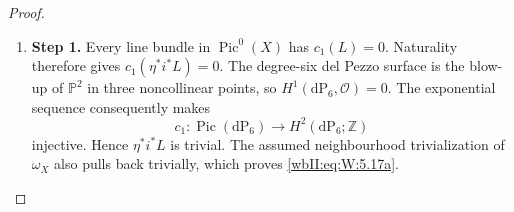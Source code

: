 \begin{proof}
\begin{enumerate}[label={$\langle1\rangle$\arabic*.},leftmargin=*]
\item 
\noindent\textbf{Step 1.} Every line bundle in $\operatorname{Pic}^0(X)$ has $c_1(L)=0$.  Naturality
therefore gives $c_1(\eta^*i^*L)=0$.  The degree-six del Pezzo surface is the
blow-up of $\mathbb P^2$ in three noncollinear points, so
$H^1(\mathrm{dP}_6,\mathcal O)=0$.  The exponential sequence consequently
makes
\[
 c_1:\operatorname{Pic}(\mathrm{dP}_6)\longrightarrow
 H^2(\mathrm{dP}_6;\mathbb Z)
\]
injective.  Hence $\eta^*i^*L$ is trivial.  The assumed neighbourhood
trivialization of $\omega_X$ also pulls back trivially, which proves
\eqref{wbII:eq:W:5.17a}.

\end{enumerate}
\end{proof}
